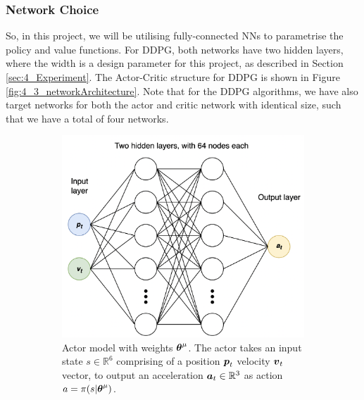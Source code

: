 \subsubsection{Network Choice}
So, in this project, we will be utilising fully-connected NNs to parametrise the policy and value functions. For DDPG, both networks have two hidden layers, where the width is a design parameter for this project, as described in Section \ref{sec:4_Experiment}. The Actor-Critic structure for DDPG is shown in Figure \ref{fig:4_3_networkArchitecture}. Note that for the DDPG algorithms, we have also target networks for both the actor and critic network with identical size, such that we have a total of four networks.
\begin{figure}[htb]
    \centering
        \begin{subfigure}[b]{.49\textwidth}
        \centering
        \includegraphics[width=.95\textwidth]{figures/4_/4_5_actor.drawio-labelled.png}
        \caption{Actor model with weights $\boldsymbol{\theta}^\mu$. The actor takes an input state $s \in \mathbb{R}^6$ comprising of a \textcolor[HTML]{004CD9}{position} ${\boldsymbol{p}}_t$ \textcolor[HTML]{009900}{velocity} ${\boldsymbol{v}}_t$ vector, to output an \textcolor[HTML]{D6C415}{acceleration} ${\boldsymbol{a}}_t  \in \mathbb{R}^3$ as action $a = \pi(s | \boldsymbol{\theta}^\mu)$.}
        \label{fig:4_3_actor}
    \end{subfigure}
    \hfill
    \begin{subfigure}[b]{0.49\textwidth}
        \centering

\end{subfigure}
\end{figure}
